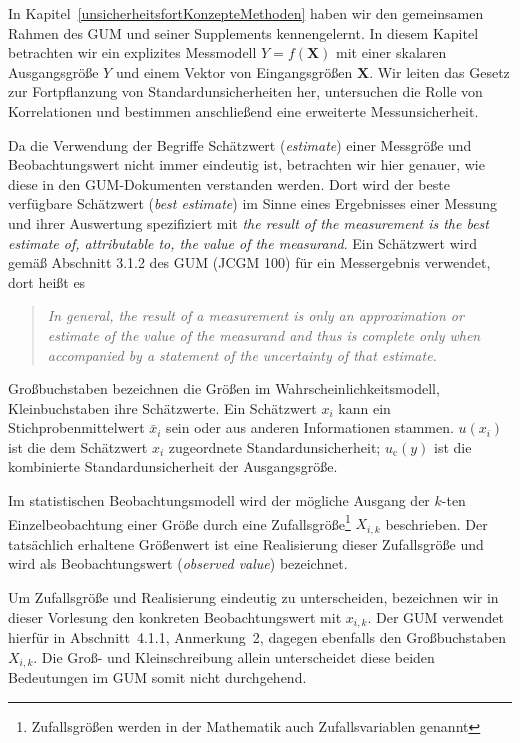 
In Kapitel~\ref{unsicherheitsfortKonzepteMethoden} haben wir den gemeinsamen Rahmen des GUM und seiner Supplements
kennengelernt. In diesem Kapitel betrachten wir ein explizites Messmodell
$Y=f(\mathbf X)$ mit einer skalaren Ausgangsgröße $Y$ und einem
Vektor von Eingangsgrößen $\mathbf X$. Wir leiten das Gesetz zur Fortpflanzung von Standardunsicherheiten her, untersuchen die Rolle von Korrelationen und
bestimmen anschließend eine erweiterte Messunsicherheit.

Da die Verwendung der Begriffe Schätzwert (\textsl{estimate}) einer Messgröße und Beobachtungswert nicht immer eindeutig ist, betrachten wir hier genauer, wie diese in den GUM-Dokumenten verstanden werden. Dort wird der beste verfügbare Schätzwert (\textsl{best estimate}) im Sinne eines Ergebnisses einer Messung und ihrer Auswertung spezifiziert mit \textsl{the result of the measurement is the best estimate of, attributable to, the value of the measurand}. Ein Schätzwert wird gemäß Abschnitt 3.1.2 des GUM (JCGM 100) für ein Messergebnis verwendet, dort heißt es

\begin{quote}
\textsl{In general, the result of a measurement is only an approximation or estimate of the value of the measurand and thus is complete only when accompanied by a statement of the uncertainty of that estimate.}
\end{quote}

Großbuchstaben bezeichnen die Größen im Wahrscheinlichkeitsmodell,
Kleinbuchstaben ihre Schätzwerte. Ein Schätzwert $x_i$ kann ein
Stichprobenmittelwert $\bar x_i$ sein oder aus anderen Informationen stammen.
$u(x_i)$ ist die dem Schätzwert $x_i$ zugeordnete Standardunsicherheit; $u_{\mathrm c}(y)$ ist die kombinierte Standardunsicherheit der Ausgangsgröße. 

Im statistischen Beobachtungsmodell wird der mögliche Ausgang der $k$-ten Einzelbeobachtung einer Größe durch eine Zufallsgröße\footnote{Zufallsgrößen werden in der Mathematik auch Zufallsvariablen genannt} $X_{i,k}$ beschrieben. Der tatsächlich erhaltene Größenwert ist eine Realisierung dieser Zufallsgröße und wird als Beobachtungswert (\textsl{observed value}) bezeichnet.

Um Zufallsgröße und Realisierung eindeutig zu unterscheiden, bezeichnen wir in dieser Vorlesung den konkreten Beobachtungswert mit $x_{i,k}$.
Der GUM verwendet hierfür in Abschnitt~4.1.1, Anmerkung~2, dagegen ebenfalls den Großbuchstaben $X_{i,k}$. Die Groß- und Kleinschreibung allein unterscheidet diese beiden Bedeutungen im GUM somit nicht durchgehend.

